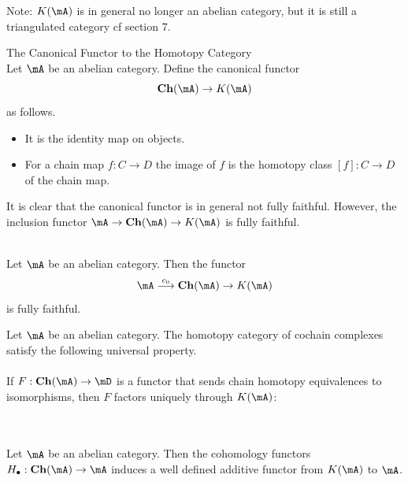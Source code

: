 \documentclass[a4paper]{article}
\begin{document}
Note: $K(\mA)$ is in general no longer an abelian category, but it is still a triangulated category cf section 7. 

\begin{defn}{The Canonical Functor to the Homotopy Category}{}\\
Let $\mA$ be an abelian category. Define the canonical functor $$\bold{Ch}(\mA)\to K(\mA)$$ as follows. 
\begin{itemize}
\item It is the identity map on objects. 
\item For a chain map $f:C\to D$ the image of $f$ is the homotopy class $[f]:C\to D$ of the chain map. 
\end{itemize}
\end{defn}

It is clear that the canonical functor is in general not fully faithful. However, the inclusion functor $\mA\to\bold{Ch}(\mA)\to K(\mA)$ is fully faithful. 

\begin{lmm}{}{}\\
Let $\mA$ be an abelian category. Then the functor $$\mA\overset{c_0}{\longrightarrow}\bold{Ch}(\mA)\to K(\mA)$$ is fully faithful. 
\end{lmm}

\begin{prp}{}{} Let $\mA$ be an abelian category. The homotopy category of cochain complexes satisfy the following universal property. \\~\\

If $F:\bold{Ch}(\mA)\to\mD$ is a functor that sends chain homotopy equivalences to isomorphisms, then $F$ factors uniquely through $K(\mA)$: \\~\\
\end{prp}

\begin{crl}{}{}\\
Let $\mA$ be an abelian category. Then the cohomology functors $H_\bullet:\bold{Ch}(\mA)\to\mA$ induces a well defined additive functor from $K(\mA)$ to $\mA$. 
\end{crl}
\end{document}
